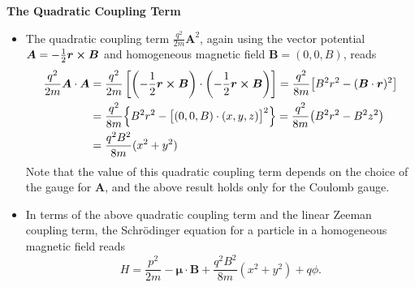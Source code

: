 \documentclass[11pt, a4paper]{article}
\newcommand{\Schro}{Schr\"{o}dinger\xspace}
\renewcommand{\vec}[1]{\bm{#1}}  %
\renewcommand{\r}{\vec{r}}  %
\newcommand{\A}{\vec{A}}  %
\newcommand{\B}{\vec{B}}  %
\newcommand{\m}{\vec{\mu}}  %
\begin{document}
\textbf{The Quadratic Coupling Term}
\begin{itemize}
	\item The quadratic coupling term $ \frac{q^{2}}{2m}\A^{2} $, again using the vector potential $ \A = -\frac{1}{2}\r \cross \vec{B} $ and homogeneous magnetic field $ \B = (0, 0, B) $, reads
	\begin{align*}
		\frac{q^{2}}{2m} \A \cdot \A &= \frac{q^{2}}{2m}\left[\left(-\frac{1}{2}\r \cross \vec{B}\right) \cdot \left(-\frac{1}{2}\r \cross \vec{B}\right)\right] = \frac{q^{2}}{8m}\big[B^{2}r^{2} - (\B \cdot \r)^{2}\big]\\
		& = \frac{q^{2}}{8m}\Big\{ B^{2}r^{2} - \big[(0, 0, B)\cdot (x, y, z)\big]^{2}\Big\} = \frac{q^{2}}{8m} \big(B^{2}r^{2} - B^{2}z^{2}\big)\\
		& = \frac{q^{2}B^{2}}{8m}(x^{2} + y^{2})
	\end{align*}
	Note that the value of this quadratic coupling term depends on the choice of the gauge for $ \A $, and the above result holds only for the Coulomb gauge.
	
	\item In terms of the above quadratic coupling term and the linear Zeeman coupling term, the \Schro equation for a particle in a homogeneous magnetic field reads
	\begin{equation*}
		H = \frac{p^{2}}{2m} - \m \cdot \B + \frac{q^{2}B^{2}}{8m}(x^{2} + y^{2}) + q\phi.
	\end{equation*}

\end{itemize}
\end{document}
